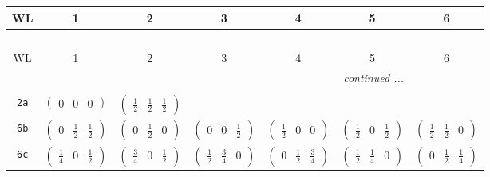 \documentclass[fleqn,9pt,landscape]{jsarticle}
\begin{document}
\begin{center}
\renewcommand{\arraystretch}{1.2}
\begin{longtable}{ccccccc}
 \hline \hline
WL & 1 & 2 & 3 & 4 & 5 & 6 \\ \hline \endfirsthead

\multicolumn{6}{l}{\tablename\ \thetable{}} \\
 \hline \hline
WL & 1 & 2 & 3 & 4 & 5 & 6 \\ \hline \endhead

 \hline \hline
\multicolumn{6}{r}{\footnotesize\it continued ...} \\ \endfoot

 \hline \hline
\multicolumn{6}{r}{} \\ \endlastfoot

{\tt 2a} & $ \begin{pmatrix} 0 & 0 & 0 \end{pmatrix} $ & $ \begin{pmatrix} \frac{1}{2} & \frac{1}{2} & \frac{1}{2} \end{pmatrix} $ & $  $ & $  $ & $  $ & $  $ \\ \hline
{\tt 6b} & $ \begin{pmatrix} 0 & \frac{1}{2} & \frac{1}{2} \end{pmatrix} $ & $ \begin{pmatrix} 0 & \frac{1}{2} & 0 \end{pmatrix} $ & $ \begin{pmatrix} 0 & 0 & \frac{1}{2} \end{pmatrix} $ & $ \begin{pmatrix} \frac{1}{2} & 0 & 0 \end{pmatrix} $ & $ \begin{pmatrix} \frac{1}{2} & 0 & \frac{1}{2} \end{pmatrix} $ & $ \begin{pmatrix} \frac{1}{2} & \frac{1}{2} & 0 \end{pmatrix} $ \\ \hline
{\tt 6c} & $ \begin{pmatrix} \frac{1}{4} & 0 & \frac{1}{2} \end{pmatrix} $ & $ \begin{pmatrix} \frac{3}{4} & 0 & \frac{1}{2} \end{pmatrix} $ & $ \begin{pmatrix} \frac{1}{2} & \frac{3}{4} & 0 \end{pmatrix} $ & $ \begin{pmatrix} 0 & \frac{1}{2} & \frac{3}{4} \end{pmatrix} $ & $ \begin{pmatrix} \frac{1}{2} & \frac{1}{4} & 0 \end{pmatrix} $ & $ \begin{pmatrix} 0 & \frac{1}{2} & \frac{1}{4} \end{pmatrix} $ \\ \hline

\end{longtable}
\end{center}
\end{document}
